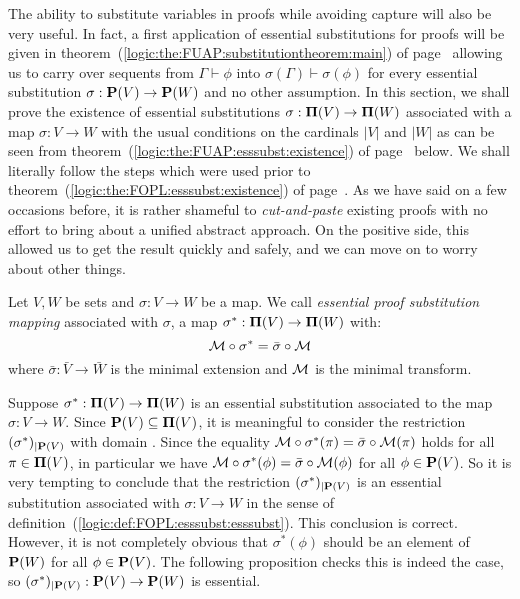 The ability to substitute variables in proofs while avoiding capture
will also be very useful. In fact, a first application of essential
substitutions for proofs will be given in
theorem~(\ref{logic:the:FUAP:substitutiontheorem:main}) of
page~\pageref{logic:the:FUAP:substitutiontheorem:main} allowing us
to carry over sequents from $\Gamma\vdash\phi$ into
$\sigma(\Gamma)\vdash\sigma(\phi)$ for every essential substitution
$\sigma:\mbox{${\bf P}(V)$}\to{\bf P}(W)$ and no other assumption. In this section,
we shall prove the existence of essential substitutions
$\sigma:\mbox{${\bf\Pi}(V)$}\to{\bf\Pi}(W)$ associated with a map $\sigma:V\to W$
with the usual conditions on the cardinals $|V|$ and $|W|$ as can be
seen from theorem~(\ref{logic:the:FUAP:esssubst:existence}) of
page~\pageref{logic:the:FUAP:esssubst:existence} below. We shall
literally follow the steps which were used prior to
theorem~(\ref{logic:the:FOPL:esssubst:existence}) of
page~\pageref{logic:the:FOPL:esssubst:existence}. As we have said on
a few occasions before, it is rather shameful to {\em cut-and-paste}
existing proofs with no effort to bring about a unified abstract
approach. On the positive side, this allowed us to get the result
quickly and safely, and we can move on to worry about other things.

\begin{defin}\label{logic:def:FUAP:esssubst:main}
Let $V,W$ be sets and $\sigma:V\to W$ be a map. We call {\em
essential proof substitution mapping} associated with $\sigma$, a
map $\sigma^{*}:\mbox{${\bf\Pi}(V)$}\to{\bf\Pi}(W)$ with:
    \begin{equation}\label{logic:def:FUAP:esssubst:main:key}
    {\cal M}\circ\sigma^{*}=\bar{\sigma}\circ{\cal M}
    \end{equation}
where $\bar{\sigma}:\bar{V}\to\bar{W}$ is the minimal extension and
${\cal M}$ is the minimal transform.
\end{defin}

Suppose $\sigma^{*}:\mbox{${\bf\Pi}(V)$}\to{\bf\Pi}(W)$ is an essential substitution
associated to the map $\sigma:V\to W$. Since $\mbox{${\bf P}(V)$}\subseteq\mbox{${\bf\Pi}(V)$}$, it
is meaningful to consider the restriction $(\sigma^{*})_{|{\bf
P}(V)}$ with domain \pv. Since the equality ${\cal
M}\circ\sigma^{*}(\pi)=\bar{\sigma}\circ{\cal M}(\pi)$ holds for all
$\pi\in\mbox{${\bf\Pi}(V)$}$, in particular we have ${\cal
M}\circ\sigma^{*}(\phi)=\bar{\sigma}\circ{\cal M}(\phi)$ for all
$\phi\in\mbox{${\bf P}(V)$}$. So it is very tempting to conclude that the
restriction $(\sigma^{*})_{|{\bf P}(V)}$ is an essential
substitution associated with $\sigma:V\to W$ in the sense of
definition~(\ref{logic:def:FOPL:esssubst:esssubst}). This conclusion
is correct. However, it is not completely obvious that
$\sigma^{*}(\phi)$ should be an element of ${\bf P}(W)$ for all
$\phi\in\mbox{${\bf P}(V)$}$. The following proposition checks this is indeed the
case, so $(\sigma^{*})_{|{\bf P}(V)}:\mbox{${\bf P}(V)$}\to{\bf P}(W)$ is essential.

